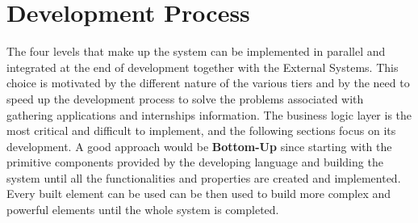 \section{Development Process}
The four levels that make up the system can be implemented in parallel and integrated at the
end of development together with the External Systems. This choice is motivated by the 
different nature of the various tiers and by the need to speed up the development process to 
solve the problems associated with gathering applications and internships information. The 
business logic layer is the most critical and difficult to implement, and the following sections 
focus on its development.
A good approach would be \textbf{Bottom-Up} since starting with the primitive components provided by the developing language and building the system until all the functionalities and properties are created and implemented. Every built element can be used can be then used to build more complex and powerful elements until the whole system is completed.


